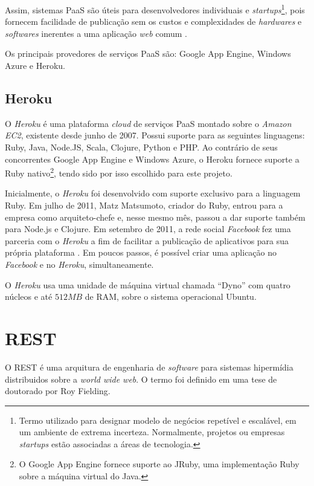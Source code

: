 	Assim, sistemas \ac{PaaS} são úteis para desenvolvedores individuais e \emph{startups}\footnote{Termo utilizado para designar modelo de negócios repetível e escalável, em um ambiente de extrema incerteza. Normalmente, projetos ou empresas \emph{startups} estão associadas a áreas de tecnologia.}, pois fornecem facilidade de publicação sem os custos e complexidades de \emph{hardwares} e \emph{softwares} inerentes a uma aplicação \emph{web} comum \cite{guardianstartup}.
	
	Os principais provedores de serviços \ac{PaaS} são: Google App Engine, Windows Azure e Heroku.
	
\subsection{Heroku}

	O \emph{Heroku} é uma plataforma \emph{cloud} de serviços \ac{PaaS} montado sobre o \emph{Amazon EC2}, existente desde junho de 2007. Possui suporte para as seguintes linguagens: Ruby, Java, Node.JS, Scala, Clojure, Python e PHP. Ao contrário de seus concorrentes Google App Engine e Windows Azure, o Heroku fornece suporte a Ruby nativo\footnote{O Google App Engine fornece suporte ao JRuby, uma implementação Ruby sobre a máquina virtual do Java.}, tendo sido por isso escolhido para este projeto.
	
	Inicialmente, o \emph{Heroku} foi desenvolvido com suporte exclusivo para a linguagem Ruby. Em julho de 2011, Matz Matsumoto, criador do Ruby, entrou para a empresa como arquiteto-chefe e, nesse mesmo mês, passou a dar suporte também para Node.js e Clojure.
Em setembro de 2011, a rede social \emph{Facebook} fez uma parceria com o \emph{Heroku} a fim de facilitar a publicação de aplicativos para sua própria plataforma \cite{faceheroku}. Em poucos passos, é possível criar uma aplicação no \emph{Facebook} e no \emph{Heroku}, simultaneamente.

O \emph{Heroku} usa uma unidade de máquina virtual chamada ``Dyno'' com quatro núcleos e até $512MB$ de RAM, sobre o sistema operacional Ubuntu.

	

\section{REST}
 O \ac{REST} é uma arquitura de engenharia de \emph{software} para sistemas hipermídia distribuidos sobre a \emph{world wide web}. O termo foi definido em uma tese de doutorado por Roy Fielding\cite{fielding}.


